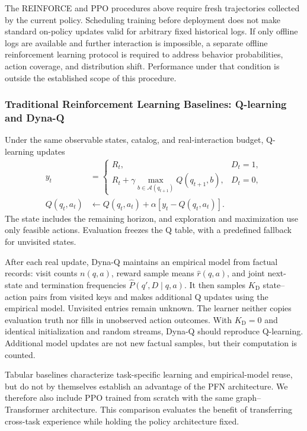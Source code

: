 \documentclass[a4paper,11pt]{article}
\numberwithin{equation}{section}
\begin{document}
The REINFORCE and PPO procedures above require fresh trajectories collected by the current policy. Scheduling training before deployment does not make standard on-policy updates valid for arbitrary fixed historical logs. If only offline logs are available and further interaction is impossible, a separate offline reinforcement learning protocol is required to address behavior probabilities, action coverage, and distribution shift. Performance under that condition is outside the established scope of this procedure.

\subsubsection{Traditional Reinforcement Learning Baselines: Q-learning and Dyna-Q}
Under the same observable states, catalog, and real-interaction budget, Q-learning\citep{watkins1992} updates
\begin{align}
y_t&=\begin{cases}R_t,&D_t=1,\\
R_t+\gamma\max_{b\in\mathcal A(q_{t+1})}Q(q_{t+1},b),&D_t=0,
\end{cases}\\
Q(q_t,a_t)&\leftarrow Q(q_t,a_t)+\alpha[y_t-Q(q_t,a_t)].
\end{align}
The state includes the remaining horizon, and exploration and maximization use only feasible actions. Evaluation freezes the Q table, with a predefined fallback for unvisited states.

After each real update, Dyna-Q maintains an empirical model from factual records: visit counts $n(q,a)$, reward sample means $\widehat r(q,a)$, and joint next-state and termination frequencies $\widehat P(q',D\mid q,a)$. It then samples $K_{\mathrm D}$ state--action pairs from visited keys and makes additional Q updates using the empirical model. Unvisited entries remain unknown. The learner neither copies evaluation truth nor fills in unobserved action outcomes. With $K_{\mathrm D}=0$ and identical initialization and random streams, Dyna-Q should reproduce Q-learning. Additional model updates are not new factual samples, but their computation is counted.

Tabular baselines characterize task-specific learning and empirical-model reuse, but do not by themselves establish an advantage of the PFN architecture. We therefore also include PPO trained from scratch with the same graph--Transformer architecture. This comparison evaluates the benefit of transferring cross-task experience while holding the policy architecture fixed.
\end{document}
